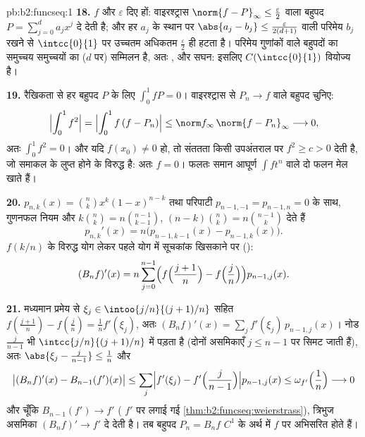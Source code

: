 \begin{solution}{pb:b2:funcseq:1}
\textbf{18.} $f$ और $\varepsilon$ दिए हों: वाइरश्ट्रास $\norm{f -
P}_\infty \leq \frac\varepsilon2$ वाला बहुपद $P = \sum_{j=0}^d a_jx^j$ दे देती
है; और हर $a_j$ के स्थान पर $\abs{a_j - b_j} \leq
\frac{\varepsilon}{2(d+1)}$ वाली परिमेय $b_j$ रखने से $\intcc{0}{1}$ पर उच्चतम
 अधिकतम $\frac\varepsilon2$ ही हटता है। परिमेय गुणांकों वाले बहुपदों का समुच्चय
 समुच्चयों का ($d$ पर)  सम्मिलन है, अतः , और सघन: इसलिए
$C(\intcc{0}{1})$ वियोज्य है।

\textbf{19.} रैखिकता से हर बहुपद $P$ के लिए $\int_0^1 fP = 0$। वाइरश्ट्रास से  $P_n \to f$ वाले बहुपद चुनिए:
\[
\Bigl|\int_0^1 f^2\Bigr|
= \Bigl|\int_0^1 f\,(f - P_n)\Bigr|
\leq \norm f_\infty\,\norm{f - P_n}_\infty
\longrightarrow 0 ,
\]
अतः $\int_0^1 f^2 = 0$। और यदि $f(x_0) \neq 0$ हो, तो संततता किसी उपअंतराल पर $f^2 \geq c > 0$ देती है, जो
समाकल के लुप्त होने के विरुद्ध है: अतः $f = 0$। फलतः समान आघूर्ण $\int f t^n$ वाले दो
 फलन मेल खाते हैं।

\textbf{20.} $p_{n,k}(x) = \binom nk x^k(1-x)^{n-k}$ तथा परिपाटी $p_{n-1,-1} = p_{n-1,n} = 0$ के साथ, गुणनफल नियम और $k\binom nk = n\binom{n-1}{k-1}$, $(n-k)\binom nk =
n\binom{n-1}{k}$ देते हैं
\[
p_{n,k}'(x) = n\bigl(p_{n-1,k-1}(x) - p_{n-1,k}(x)\bigr) .
\]
$f(k/n)$ के विरुद्ध योग लेकर पहले योग में सूचकांक खिसकाने पर ():
\[
(B_nf)'(x) = n\sum_{j=0}^{n-1}\Bigl(f\Bigl(\frac{j+1}n\Bigr)
- f\Bigl(\frac jn\Bigr)\Bigr)p_{n-1,j}(x) .
\]

\textbf{21.} मध्यमान प्रमेय से $\xi_j \in
\intoo{j/n}{(j+1)/n}$ सहित $f(\frac{j+1}n) -
f(\frac jn) = \frac1n f'(\xi_j)$, अतः $(B_nf)'(x) = \sum_j
f'(\xi_j)\,p_{n-1,j}(x)$। नोड $\frac{j}{n-1}$ भी $\intcc{j/n}{(j+1)/n}$ में
पड़ता है (दोनों असमिकाएँ $j \leq
n-1$ पर सिमट जाती हैं), अतः $\abs{\xi_j - \frac j{n-1}} \leq \frac1n$ और 
\[
\bigl|(B_nf)'(x) - B_{n-1}(f')(x)\bigr|
\leq \sum_j\Bigl|f'(\xi_j) -
f'\Bigl(\frac{j}{n-1}\Bigr)\Bigr| p_{n-1,j}(x)
\leq \omega_{f'}\Bigl(\frac1n\Bigr) \longrightarrow 0
\]
और चूँकि  $B_{n-1}(f') \to f'$ ( $f'$ पर लगाई गई \cref{thm:b2:funcseq:weierstrass}), त्रिभुज असमिका
 $(B_nf)' \to f'$ दे देती है। तब बहुपद $P_n = B_nf$ $C^1$ के अर्थ में $f$ पर
अभिसरित होते हैं।


\end{solution}
